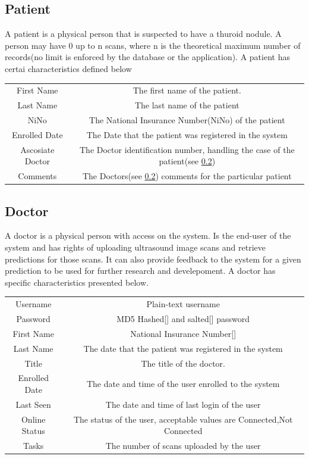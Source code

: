 	\subsection{Patient}
	\label{patient-definition}
	A patient is a physical person that is suspected to have a thuroid nodule. A person may have 0 up to n scans, where n is the theoretical
	maximum number of records(no limit is enforced by the database or the application). A patient has certai 
	characteristics defined below
	\begin{center}
		\begin{tabular}{ |c|c| } 
			\hline
			First Name & The first name of the patient.\\
			Last Name & The last name of the patient \\
			NiNo & The National Insurance Number(NiNo) of the patient \\
			Enrolled Date & The Date that the patient was registered in the system \\
			Ascosiate Doctor& The Doctor identification number, handling the case of the patient(see \ref{doctor-definition}) \\
			Comments& The Doctors(see \ref{doctor-definition}) comments for the particular patient\\
			\hline
		\end{tabular}
	\end{center}
	\subsection{Doctor}
	\label{doctor-definition}
	A doctor is a physical person with access on the system. Is the end-user of the system and has rights of uploading ultrasound image
	scans and retrieve predictions for those scans. It can also provide feedback to the system for a given prediction to be used for 
	further research and develepoment. A doctor has specific characteristics presented below.
	\begin{center}
		\begin{tabular}{ |c|c| } 
			\hline
			Username & Plain-text username\\
			Password & MD5 Hashed[\cite{rfc1321}] and salted[\cite{MANBER1996171}] password \\
			First Name & National Insurance Number[\cite{nino-format}] \\
			Last Name & The date that the patient was registered in the system \\
			Title& The title of the doctor.\\
			Enrolled Date& The date and time of the user enrolled to the system\\
			Last Seen& The date and time of last login of the user \\
			Online Status& The status of the user, acceptable values are Connected,Not Connected \\
			Tasks& The number of scans uploaded by the user \\
			\hline
		\end{tabular}
	\end{center}

